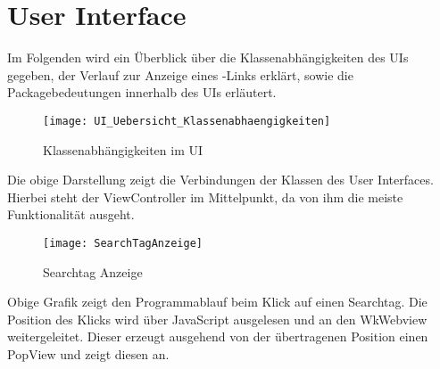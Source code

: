 
\chapter{User Interface}

Im Folgenden wird ein Überblick über die Klassenabhängigkeiten des UIs gegeben, der Verlauf zur Anzeige eines \SEARCH-Links erklärt, sowie die Packagebedeutungen innerhalb des UIs erläutert.

\begin{figure}[h]
	\centering
	\texttt{[image: UI\_Uebersicht\_Klassenabhaengigkeiten]}
	\caption{Klassenabhängigkeiten im UI}
	\label{fig:Klassenabhängigkeiten}
\end{figure}

Die obige Darstellung zeigt die Verbindungen der Klassen des User Interfaces. Hierbei steht der ViewController im Mittelpunkt, da von ihm die meiste Funktionalität ausgeht.

\begin{figure}[ht]
	\centering
	\texttt{[image: SearchTagAnzeige]}
	\caption{Searchtag Anzeige}
	\label{fig:Searchtag Anzeige}
\end{figure}

Obige Grafik zeigt den Programmablauf beim Klick auf einen Searchtag. Die Position des Klicks wird über JavaScript ausgelesen und an den WkWebview weitergeleitet. Dieser erzeugt ausgehend von der übertragenen Position einen PopView und zeigt diesen an. 


\newpage

\newpage

\newpage

\newpage

\newpage


